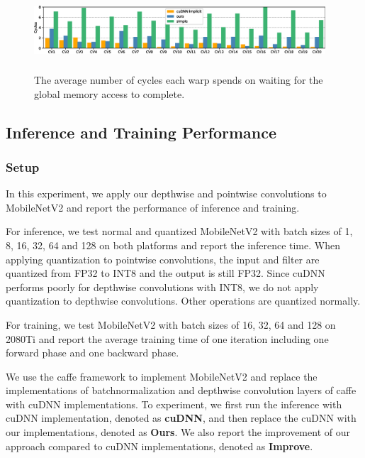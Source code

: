 \begin{figure}
    \centering
    \includegraphics[width=0.97\textwidth,height=3cm]{./figure/longscore.eps}
    \caption{The average number of cycles each warp spends on waiting for the global memory access to complete.}
    \label{fig:stalllongscore}
\end{figure}

\subsection{Inference and Training Performance}
\label{sec:inferexp}
\subsubsection{Setup}
In this experiment, we apply our depthwise and pointwise convolutions to MobileNetV2 and report the performance of inference and training.

For inference, we test normal and quantized MobileNetV2 with batch sizes of 1, 8, 16, 32, 64 and 128 on both platforms and report the inference time.
When applying quantization to pointwise convolutions, the input and filter are quantized from FP32 to INT8 and the output is still FP32.
Since cuDNN performs poorly for depthwise convolutions with INT8, we do not apply quantization to  depthwise convolutions.
Other operations are quantized normally.

For training, we test MobileNetV2 with batch sizes of 16, 32, 64 and 128 on 2080Ti and report the average training time of one iteration including one forward phase and one backward phase.

We use the caffe framework to implement MobileNetV2 and replace the implementations of batchnormalization and depthwise convolution layers of caffe with cuDNN implementations.
To experiment, we first run the inference with cuDNN implementation, denoted as \textbf{cuDNN}, and then replace the cuDNN with our implementations, denoted as \textbf{Ours}.
We also report the improvement of our approach compared to cuDNN implementations, denoted as \textbf{Improve}.

